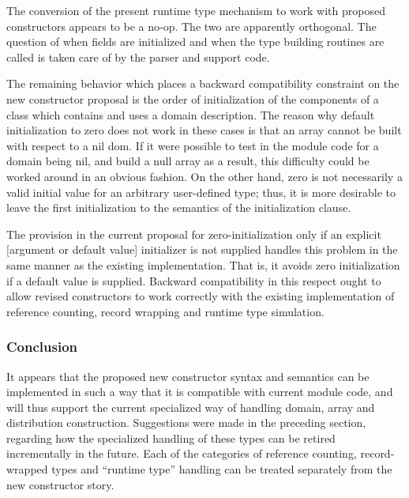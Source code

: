 \begin{chapelexample}
The conversion of the present runtime type mechanism to work with proposed
constructors appears to be a no-op.  The two are apparently orthogonal.  The
question of when fields are initialized and when the type building routines are
called is taken care of by the parser and support code.
\end{chapelexample}

The remaining behavior which places a backward compatibility constraint on the
new constructor proposal is the order of initialization of the components of a
class which contains and uses a domain description.  The reason why default
initialization to zero does not work in these cases is that an array cannot be
built with respect to a nil dom.  If it were possible to test in the module code
for a domain being nil, and build a null array as a result, this difficulty
could be worked around in an obvious fashion.  On the other hand, zero is not
necessarily a valid initial value for an arbitrary user-defined type; thus, it
is more desirable to leave the first initialization to the semantics of the
initialization clause.

The provision in the current proposal for zero-initialization only if an
explicit [argument or default value] initializer is not supplied handles this
problem in the same manner as the existing implementation.  That is, it avoids
zero initialization if a default value is supplied.  Backward compatibility in
this respect ought to allow revised constructors to work correctly with the
existing implementation of reference counting, record wrapping and runtime type
simulation.

\subsubsection{Conclusion}

It appears that the proposed new constructor syntax and semantics can be
implemented in such a way that it is compatible with current module code, and
will thus support the current specialized way of handling domain, array and
distribution construction.  Suggestions were made in the preceding section,
regarding how the specialized handling of these types can be retired
incrementally in the future.  Each of the categories of reference counting,
record-wrapped types and ``runtime type'' handling can be treated separately
from the new constructor story.

